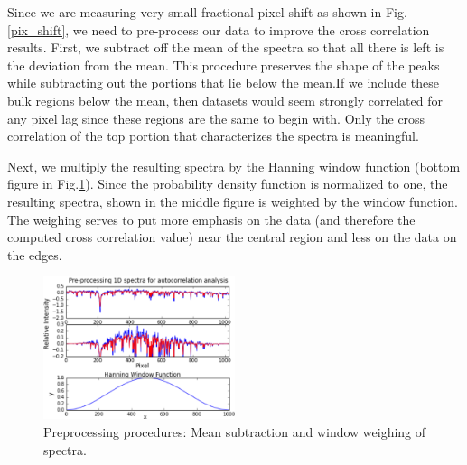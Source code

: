 \documentclass[authoryear, 12pt,5p, times]{elsarticle}
\begin{document}
Since we are measuring very small fractional pixel shift as shown in Fig.\ref{pix_shift}, we need to pre-process our data to improve the cross correlation results. First, we subtract off the mean of the spectra so that all there is left is the deviation from the mean. This procedure preserves the shape of the peaks  while subtracting out the portions that lie below the mean.If we include these bulk regions below the mean, then datasets would seem strongly correlated for any pixel lag since these regions are the same to begin with.  Only the cross correlation of the top portion that characterizes the spectra is meaningful.


Next, we multiply the resulting spectra by the Hanning window function (bottom figure in Fig.\ref{process_corr_spectra}). Since the probability density function is normalized to one, the resulting spectra, shown in the middle figure is weighted by the window function. The weighing serves to put more emphasis on the data (and therefore the computed cross correlation value) near the central region and less on the data on the edges. 
\begin{figure}[h!]
\includegraphics[width=0.5\textwidth]{figures/process_corr_spectra}
\caption{Preprocessing procedures: Mean subtraction and window weighing of spectra.}
\label{process_corr_spectra}
\end{figure}
\end{document}
